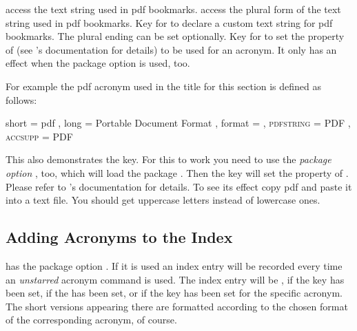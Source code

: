 \documentclass[DIV10,toc=index,toc=bib,hyperfootnotes=false]{cnpkgdoc}
\begin{document}
\begin{beschreibung}
 \newline
   access the text string used in \acs{pdf} bookmarks.
 \newline
   access the plural form of the text string used in \acs{pdf} bookmarks.
 \newline
   Key for  to declare a custom text string for \acs{pdf}
   bookmarks. The plural ending can be set optionally.
 \newline
   Key for  to set the 
   property of  (see 's documentation for details)
   to be used for an acronym. It only has an effect when the package option 
   is used, too.
\end{beschreibung}

For example the \acs{pdf} acronym used in the title for this section is defined
as follows:
\begin{beispiel}
  {
    short     = pdf ,
    long      = Portable Document Format ,
    format    = \scshape ,
    pdfstring = PDF ,
    accsupp   = PDF
  }
\end{beispiel}

This also demonstrates the  key. For this to work you need to use
the \emph{package option} , too, which will load the package
. Then the key  will set the 
property of . Please refer to 's documentation
for details. To see its effect copy \ac{pdf} and paste it into a text file. You
should get uppercase letters instead of lowercase ones.

\subsection{Adding Acronyms to the Index}\label{ssec:index}
\noindent{}\acro has the package option . If it is
used an index entry will be recorded every time an \emph{unstarred} acronym
command is used. The index entry will be , 
if the  key has been set,  if the
 has been set, or  if the key  has been
set for the specific acronym. The short versions appearing there are formatted
according to the chosen format of the corresponding acronym, of course.
\end{document}
